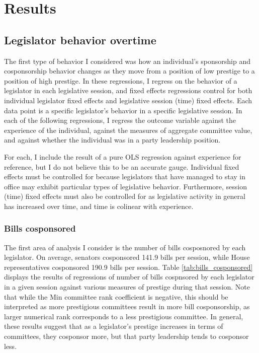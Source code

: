 \documentclass{article}
\begin{document}
\section{Results} 
\subsection{Legislator behavior overtime}
The first type of behavior I considered was how an individual's sponsorship and cosponsorship behavior changes as they move from a position of low prestige to a position of high prestige. In these regressions, I regress on the behavior of a legislator in each legislative session, and fixed effects regressions control for both individual legislator fixed effects and legislative session (time) fixed effects. Each data point is a specific legislator's behavior in a specific legislative session. In each of the following regressions, I regress the outcome variable against the experience of the individual, against the measures of aggregate committee value, and against whether the individual was in a party leadership position. 

For each, I include the result of a pure OLS regression against experience for reference, but I do not believe this to be an accurate gauge. Individual fixed effects must be controlled for because legislators that have managed to stay in office may exhibit particular types of legislative behavior. Furthermore, session (time) fixed effects must also be controlled for as legislative activity in general has increased over time, and time is colinear with experience. 

\subsubsection{Bills cosponsored}
\label{result:bills_cosponsored}
The first area of analysis I consider is the number of bills cosposnored by each legislator. On average, senators cosponsored 141.9 bills per session, while House representatives cosponsored 190.9 bills per session. Table \ref{tab:bills_cosponsored} displays the results of regressions of number of bills cospnsored by each legislator in a given session against various measures of prestige during that session. Note that while the Min committee rank coefficient is negative, this should be interpreted as more prestigious committees result in more bill cosponsorship, as larger numerical rank corresponds to a less prestigious committee. In general, these results suggest that as a legislator's prestige increases in terms of committees, they cosponsor more, but that party leadership tends to cosponsor less. 
\end{document}
